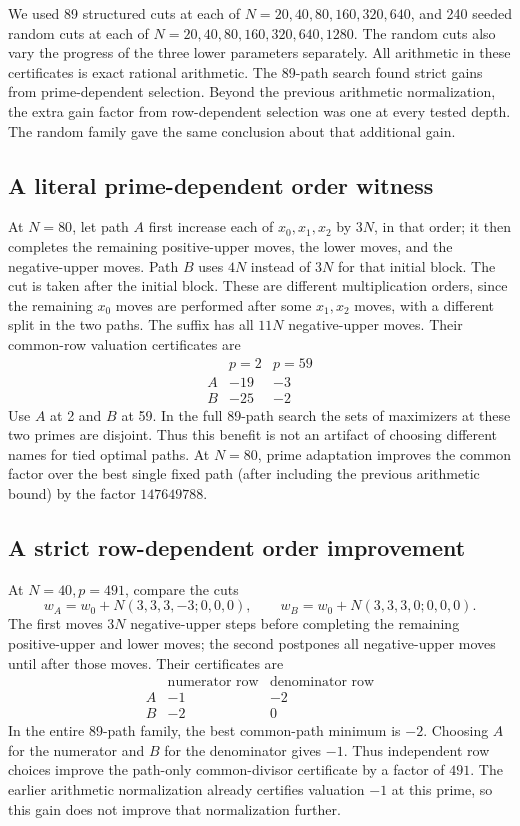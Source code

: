 \documentclass[11pt]{article}
\begin{document}
We used 89 structured cuts at each of
$N=20,40,80,160,320,640$, and 240 seeded random cuts at each of
$N=20,40,80,160,320,640,1280$. The random cuts also vary the progress
of the three lower parameters separately. All arithmetic in these
certificates is exact rational arithmetic. The 89-path search found
strict gains from prime-dependent selection. Beyond the previous
arithmetic normalization, the extra gain factor from row-dependent
selection was one at every tested depth. The random family gave the
same conclusion about that additional gain.

\subsection{A literal prime-dependent order witness}
At $N=80$, let path $A$ first increase each of $x_0,x_1,x_2$ by
$3N$, in that order; it then completes the remaining positive-upper
moves, the lower moves, and the negative-upper moves.
Path $B$ uses $4N$ instead of $3N$ for that initial block.
The cut is taken after the initial block. These are different
multiplication orders, since the remaining $x_0$ moves are performed
after some $x_1,x_2$ moves, with a different split in the two paths.
The suffix has all $11N$ negative-upper moves.
Their common-row valuation certificates are
\[
\begin{array}{c|rr}
 &p=2&p=59\\\hline
A&-19&-3\\
B&-25&-2
\end{array}
\]
Use $A$ at 2 and $B$ at 59. In the full 89-path search the sets of
maximizers at these two primes are disjoint. Thus this benefit is not
an artifact of choosing different names for tied optimal paths.
At $N=80$, prime adaptation improves the common factor over the best
single fixed path (after including the previous arithmetic bound)
by the factor $147649788$.

\subsection{A strict row-dependent order improvement}
At $N=40,p=491$, compare the cuts
\[
 w_A=w_0+N(3,3,3,-3;0,0,0),\qquad
 w_B=w_0+N(3,3,3,0;0,0,0).
\]
The first moves $3N$ negative-upper steps before completing the remaining
positive-upper and lower moves; the second postpones all negative-upper
moves until after those moves. Their certificates are
\[
\begin{array}{c|rr}
 &\text{numerator row}&\text{denominator row}\\\hline
A&-1&-2\\
B&-2&0
\end{array}
\]
In the entire 89-path family, the best common-path minimum is $-2$.
Choosing $A$ for the numerator and $B$ for the denominator gives $-1$.
Thus independent row choices improve the path-only common-divisor
certificate by a factor of $491$. The earlier arithmetic normalization
already certifies valuation $-1$ at this prime, so this gain does not
improve that normalization further.
\end{document}
